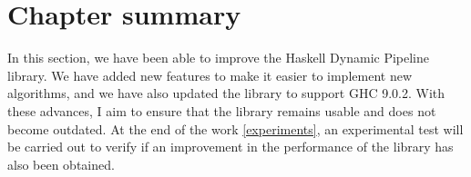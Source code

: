 \section{Chapter summary}
In this section, we have been able to improve the Haskell Dynamic Pipeline library.
We have added new features to make it easier to implement new algorithms, and we have also updated the library to support GHC 9.0.2.
With these advances, I aim to ensure that the library remains usable and does not become outdated.
At the end of the work \ref{experiments}, an experimental test will be carried out to verify if an improvement in the performance of the library has also been obtained.

